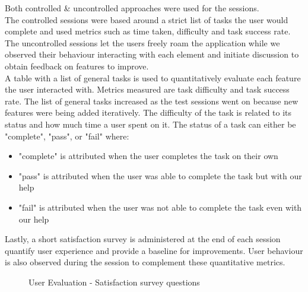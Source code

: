\noindent Both controlled \& uncontrolled approaches were used for the sessions.\\
The controlled sessions were based around a strict list of tasks the user would complete and used metrics such as time taken, difficulty and task success rate.\\
The uncontrolled sessions let the users freely roam the application while we observed their behaviour interacting with each element and initiate discussion to obtain feedback on features to improve.\\

\noindent A table with a list of general tasks is used to quantitatively evaluate each feature the user interacted with. Metrics measured are task difficulty and task success rate. The list of general tasks increased as the test sessions went on because new features were being added iteratively.
The difficulty of the task is related to its status and how much time a user spent on it. The status of a task can either be "complete", "pass", or "fail" where:
\begin{itemize}
    \item "complete" is attributed when the user completes the task on their own
    \item "pass" is attributed when the user was able to complete the task but with our help
    \item "fail" is attributed when the user was not able to complete the task even with our help
\end{itemize}
Lastly, a short satisfaction survey is administered at the end of each session quantify user experience and provide a baseline for improvements. User behaviour is also observed during the session to complement these quantitative metrics.\\
\begin{figure}
    \centering
    \caption{User Evaluation - Satisfaction survey questions}
\end{figure}

